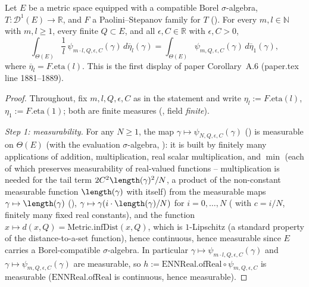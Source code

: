 \begin{corollary}\label{etaRepeats-psi}
  Let $E$ be a metric space equipped with a compatible Borel $\sigma$-algebra, $T \colon \mathcal{D}^1(E) \to \mathbb{R}$, and
  $F$ a Paolini--Stepanov family for $T$ (). For every $m,l \in \mathbb{N}$ with
  $m,l \ge 1$, every finite $Q \subset E$, and all $\epsilon, C \in \mathbb{R}$ with $\epsilon,C>0$,
  \[
    \int_{\Theta(E)} \frac{1}{l} \, \psi_{m\cdot l,Q,\epsilon,C}(\gamma) \, d\overline{\eta}_l(\gamma)
    = \int_{\Theta(E)} \psi_{m,Q,\epsilon,C}(\gamma) \, d\overline{\eta}_1(\gamma)
    ,
  \]
  where $\overline{\eta}_l = F.\mathrm{eta}(l)$. This is the first display of paper
  Corollary~A.6 (paper.tex line 1881--1889).
\end{corollary}
\begin{proof}
  Throughout, fix $m,l,Q,\epsilon,C$ as in the statement and write $\eta_l := F.\mathrm{eta}(l)$,
  $\eta_1 := F.\mathrm{eta}(1)$; both are finite measures (, field
  \emph{finite}).

  \emph{Step 1: measurability.} For any $N \ge 1$, the map $\gamma \mapsto
  \psi_{N,Q,\epsilon,C}(\gamma)$ () is measurable on $\Theta(E)$ (with the evaluation
  $\sigma$-algebra, ): it is built by finitely many applications of
  addition, multiplication, real scalar multiplication, and $\min$ (each of which preserves
  measurability of real-valued functions -- multiplication is needed for the tail term
  $2C^2\length(\gamma)^2/N$, a product of the non-constant measurable function $\length(\gamma)$
  with itself) from the measurable maps $\gamma \mapsto \length(\gamma)$
  (), $\gamma \mapsto \gamma(i\cdot\length(\gamma)/N)$ for
  $i=0,\dotsc,N$ ( with $c=i/N$, finitely many fixed real
  constants), and the function $x \mapsto d(x,Q) = \mathrm{Metric.infDist}(x,Q)$, which is
  $1$-Lipschitz (a standard property of the distance-to-a-set function), hence continuous, hence
  measurable since $E$ carries a Borel-compatible $\sigma$-algebra. In particular $\gamma \mapsto
  \psi_{m\cdot l,Q,\epsilon,C}(\gamma)$ and $\gamma \mapsto \psi_{m,Q,\epsilon,C}(\gamma)$ are
  measurable, so $h := \mathrm{ENNReal.ofReal} \circ \psi_{m,Q,\epsilon,C}$ is measurable
  ($\mathrm{ENNReal.ofReal}$ is continuous, hence measurable).


\end{proof}
